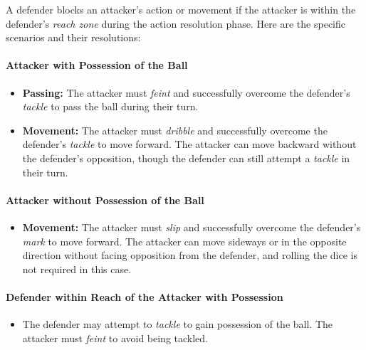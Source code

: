 \documentclass[12pt]{article}
\begin{document}
A defender blocks an attacker's action or movement if the attacker is within the defender's \emph{reach zone }during the action resolution phase. Here are the specific scenarios and their resolutions:

\paragraph{Attacker with Possession of the Ball}

\begin{rulebox}
\begin{itemize}
\item \textbf{Passing:} The attacker must \emph{feint} and successfully overcome the defender's \emph{tackle} to pass the ball during their turn.
\item \textbf{Movement:} The attacker must \emph{dribble} and successfully overcome the defender's \emph{tackle} to move forward. The attacker can move backward without the defender's opposition, though the defender can still attempt a \emph{tackle }in their turn.
\end{itemize}
\end{rulebox}

\paragraph{Attacker without Possession of the Ball}

\begin{rulebox}
\begin{itemize}
\item \textbf{Movement:} The attacker must \emph{slip} and successfully overcome the defender's \emph{mark} to move forward. The attacker can move sideways or in the opposite direction without facing opposition from the defender, and rolling the dice is not required in this case.
\end{itemize}
\end{rulebox}

\paragraph{Defender within Reach of the Attacker with Possession}

\begin{rulebox}
\begin{itemize}
\item The defender may attempt to \emph{tackle} to gain possession of the ball. The attacker must \emph{feint} to avoid being tackled.
\end{itemize}
\end{rulebox}
\end{document}
